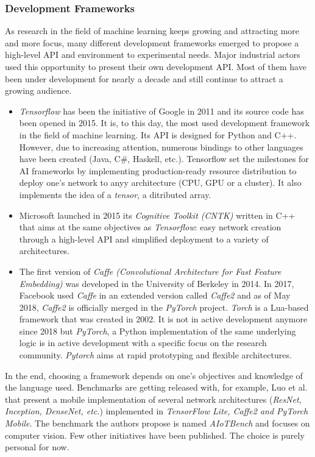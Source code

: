\subsubsection{Development Frameworks}

As research in the field of machine learning keeps growing and attracting more and more focus, many different development frameworks emerged to propose a high-level API and environment to experimental needs. Major industrial actors used this opportunity to present their own development API. Most of them have been under development for nearly a decade and still continue to attract a growing audience.

\begin{itemize}
  \item \emph{Tensorflow} has been the initiative of Google in 2011 and its source code has been opened in 2015. It is, to this day, the most used development framework in the field of machine learning. Its API is designed for Python and C++. However, due to increasing attention, numerous bindings to other languages have been created (Java, C\#, Haskell, etc.). Tensorflow set the milestones for AI frameworks by implementing production-ready resource distribution to deploy one's network to anyy architecture (CPU, GPU or a cluster). It also implements the idea of a \emph{tensor}, a ditributed array.
  \item Microsoft launched in 2015 its \emph{Cognitive Toolkit (CNTK)} written in C++ that aims at the same objectives as \emph{Tensorflow}: easy network creation through a high-level API and simplified deployment to a variety of architectures.
  \item The first version of \emph{Caffe (Convolutional Architecture for Fast Feature Embedding)} was developed in the University of Berkeley in 2014. In 2017, Facebook used \emph{Caffe} in an extended version called \emph{Caffe2} and as of May 2018, \emph{Caffe2} is officially merged in the \emph{PyTorch} project.
  \emph{Torch} is a Lua-based framework that was created in 2002. It is not in active development anymore since 2018 but \emph{PyTorch}, a Python implementation of the same underlying logic is in active development with a specific focus on the research community. \emph{Pytorch} aims at rapid prototyping and flexible architectures.
\end{itemize}

In the end, choosing a framework depends on one's objectives and knowledge of the language used. Benchmarks are getting released with, for example, Luo et al. \cite{Luo2020} that present a mobile implementation of several network architectures (\emph{ResNet, Inception, DenseNet, etc.}) implemented in \emph{TensorFlow Lite, Caffe2 and PyTorch Mobile}. The benchmark the authors propose is named \emph{AIoTBench} and focuses on computer vision. Few other initiatives have been published. The choice is purely personal for now.

